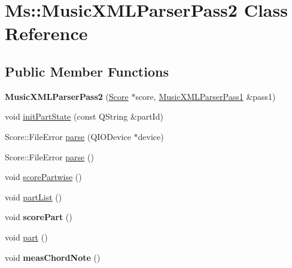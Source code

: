 \hypertarget{class_ms_1_1_music_x_m_l_parser_pass2}{}\section{Ms\+:\+:Music\+X\+M\+L\+Parser\+Pass2 Class Reference}
\label{class_ms_1_1_music_x_m_l_parser_pass2}
\subsection*{Public Member Functions}
\begin{DoxyCompactItemize}
\item 
\mbox{\label{class_ms_1_1_music_x_m_l_parser_pass2_a56e9e309e8dc346213f9be412e57fc5d}} 
{\bfseries Music\+X\+M\+L\+Parser\+Pass2} (\hyperlink{class_ms_1_1_score}{Score} $\ast$score, \hyperlink{class_ms_1_1_music_x_m_l_parser_pass1}{Music\+X\+M\+L\+Parser\+Pass1} \&pass1)
\item 
void \hyperlink{class_ms_1_1_music_x_m_l_parser_pass2_a3c2d4ccceaad560493c5aa8d33bf8946}{init\+Part\+State} (const Q\+String \&part\+Id)
\item 
Score\+::\+File\+Error \hyperlink{class_ms_1_1_music_x_m_l_parser_pass2_aa540cd2d8b4a9ec0cd89dd6c4005901b}{parse} (Q\+I\+O\+Device $\ast$device)
\item 
Score\+::\+File\+Error \hyperlink{class_ms_1_1_music_x_m_l_parser_pass2_a95e04fe5031f4c477ad44569980315b9}{parse} ()
\item 
void \hyperlink{class_ms_1_1_music_x_m_l_parser_pass2_afab0f4e00bcb58b3e0f480663f5a394c}{score\+Partwise} ()
\item 
void \hyperlink{class_ms_1_1_music_x_m_l_parser_pass2_a7fb4aa7a1d019dfb68a66885df1b76d3}{part\+List} ()
\item 
\mbox{\label{class_ms_1_1_music_x_m_l_parser_pass2_a2714e367b34679a2b2545c88a7c00d94}} 
void {\bfseries score\+Part} ()
\item 
void \hyperlink{class_ms_1_1_music_x_m_l_parser_pass2_aabf559efdedce1289a576e8a6f177d21}{part} ()
\item 
\mbox{\label{class_ms_1_1_music_x_m_l_parser_pass2_a2863b334c80325f884359b7498d046a1}} 
void {\bfseries meas\+Chord\+Note} ()
\item 

\end{DoxyCompactItemize}
